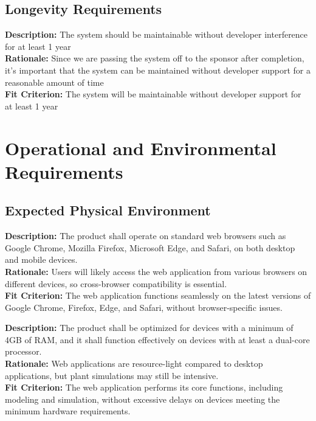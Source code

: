 \documentclass[12pt]{article}
\begin{document}
\subsection{Longevity Requirements}
\begin{tcolorbox}[title=PL1]
  \textbf{Description:} The system should be maintainable without developer interference for at least 1 year\\
  \textbf{Rationale:} Since we are passing the system off to the sponsor after completion, it's important that the system can be maintained without developer support for a reasonable amount of time \\
  \textbf{Fit Criterion:} The system will be maintainable without developer support for at least 1 year
\end{tcolorbox}

\section{Operational and Environmental Requirements}

\subsection{Expected Physical Environment}

\begin{tcolorbox}[title=OEEP1]
\textbf{Description:} The product shall operate on standard web browsers such as Google Chrome, Mozilla Firefox, Microsoft Edge, and Safari, on both desktop and mobile devices. \\
\textbf{Rationale:} Users will likely access the web application from various browsers on different devices, so cross-browser compatibility is essential. \\
\textbf{Fit Criterion:} The web application functions seamlessly on the latest versions of Google Chrome, Firefox, Edge, and Safari, without browser-specific issues.
\end{tcolorbox}

\vspace{0.5cm}

\begin{tcolorbox}[title=OEEP2]
\textbf{Description:} The product shall be optimized for devices with a minimum of 4GB of RAM, and it shall function effectively on devices with at least a dual-core processor. \\
\textbf{Rationale:} Web applications are resource-light compared to desktop applications, but plant simulations may still be intensive. \\
\textbf{Fit Criterion:} The web application performs its core functions, including modeling and simulation, without excessive delays on devices meeting the minimum hardware requirements.
\end{tcolorbox}
\end{document}
